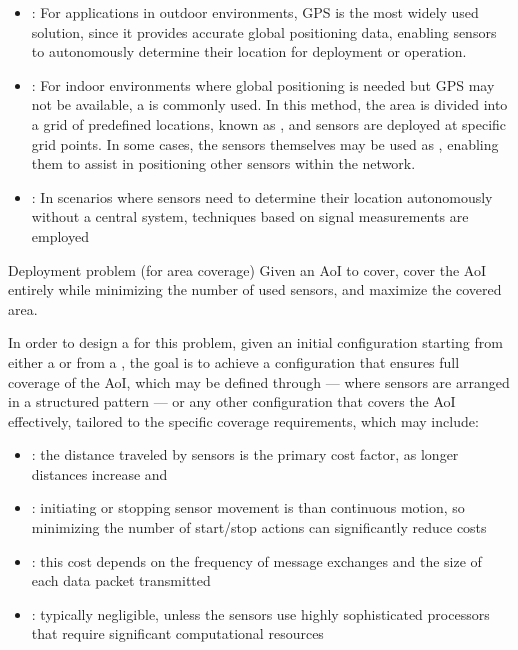\documentclass[a4paper, 12pt]{report}
\begin{document}
    \begin{itemize}
        \item {}: For applications in outdoor environments, GPS is the most widely used solution, since it provides accurate global positioning data, enabling sensors to autonomously determine their location for deployment or operation.
        \item {}: For indoor environments where global positioning is needed but GPS may not be available, a  is commonly used. In this method, the area is divided into a grid of predefined locations, known as , and sensors are deployed at specific grid points. In some cases, the sensors themselves may be used as , enabling them to assist in positioning other sensors within the network.
        \item {}: In scenarios where sensors need to determine their location autonomously without a central system, techniques based on signal measurements are employed
    \end{itemize}

    \begin{frameddefn}{Deployment problem (for area coverage)}
        Given an AoI to cover, cover the AoI entirely while minimizing the number of used sensors, and maximize the covered area.
    \end{frameddefn}

    In order to design a  for this problem, given an initial configuration starting from either a  or from a , the goal is to achieve a configuration that ensures full coverage of the AoI, which may be defined through  --- where sensors are arranged in a structured pattern --- or any other configuration that covers the AoI effectively, tailored to the specific coverage requirements, which may include:

    \begin{itemize}
        \item {}: the distance traveled by sensors is the primary cost factor, as longer distances increase  and 
        \item {}: initiating or stopping sensor movement is  than continuous motion, so minimizing the number of start/stop actions can significantly reduce costs
        \item {}: this cost depends on the frequency of message exchanges and the size of each data packet transmitted
        \item {}: typically negligible, unless the sensors use highly sophisticated processors that require significant computational resources
    \end{itemize}
\end{document}

